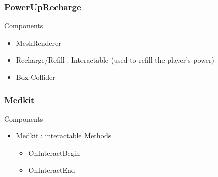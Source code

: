 \documentclass[11pt]{article}
\begin{document}
\subsubsection{PowerUpRecharge}
Components
\begin{itemize}
	\item MeshRenderer
	\item Recharge/Refill : Interactable (used to refill the player’s power)
	\item Box Collider
\end{itemize}

\subsubsection{Medkit}
Components
\begin{itemize}
	\item Medkit : interactable
	\newline Methods
	\begin{itemize}
		\item OnInteractBegin
		\item OnInteractEnd
	\end{itemize}
\end{itemize}
\end{document}
